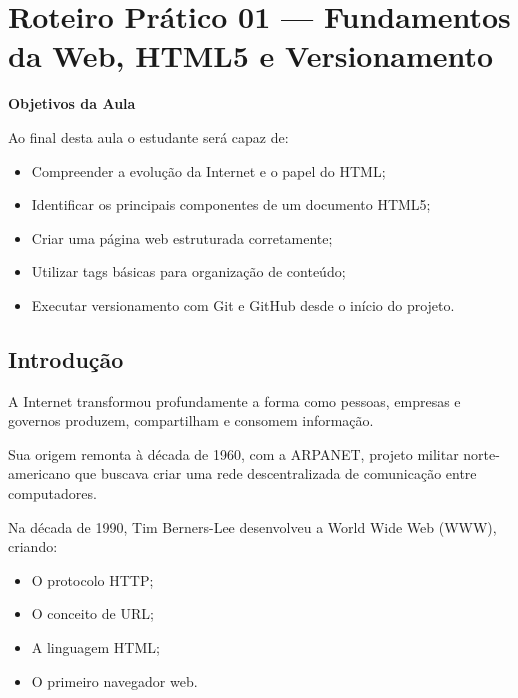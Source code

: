 \documentclass[12pt,a4paper]{article}
\begin{document}
\section{Roteiro Prático 01 — Fundamentos da Web, HTML5 e Versionamento}


\begin{boxObjetivos}
\textbf{Objetivos da Aula}

Ao final desta aula o estudante será capaz de:

\begin{itemize}
\item Compreender a evolução da Internet e o papel do HTML;
\item Identificar os principais componentes de um documento HTML5;
\item Criar uma página web estruturada corretamente;
\item Utilizar tags básicas para organização de conteúdo;
\item Executar versionamento com Git e GitHub desde o início do projeto.
\end{itemize}
\end{boxObjetivos}


\subsection{Introdução}

A Internet transformou profundamente a forma como pessoas, empresas e governos produzem, compartilham e consomem informação. 

Sua origem remonta à década de 1960, com a ARPANET, projeto militar norte-americano que buscava criar uma rede descentralizada de comunicação entre computadores.

Na década de 1990, Tim Berners-Lee desenvolveu a World Wide Web (WWW), criando:

\begin{itemize}
\item O protocolo HTTP;
\item O conceito de URL;
\item A linguagem HTML;
\item O primeiro navegador web.
\end{itemize}
\end{document}
